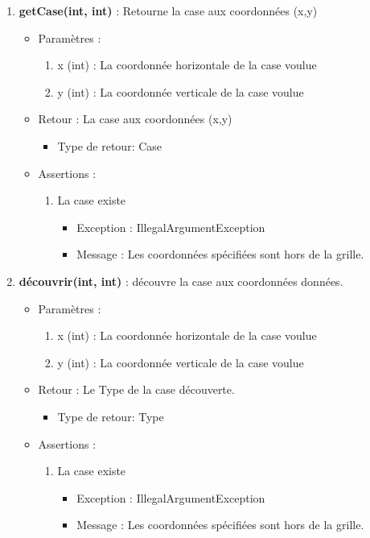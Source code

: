\begin{itemize}
\begin{enumerate}
    \item {\bf getCase(int, int) }: Retourne la case aux coordonnées (x,y)
      \begin{itemize}
      \item Paramètres : 
        \begin{enumerate}
        \item x (int) : La coordonnée horizontale de la case voulue
        \item y (int) : La coordonnée verticale de la case voulue          
        \end{enumerate}
      \item Retour : La case aux coordonnées (x,y)
          \begin{itemize}
          \item Type de retour: Case
          \end{itemize}
      \item Assertions : 
        \begin{enumerate}
        \item La case existe
          \begin{itemize}
            \item Exception : IllegalArgumentException
          \item Message : Les coordonnées spécifiées sont hors de la grille.
          \end{itemize}
        \end{enumerate}
      \end{itemize}
      
    \item {\bf découvrir(int, int) }: découvre la case aux coordonnées données.
      \begin{itemize}
      \item Paramètres : 
        \begin{enumerate}
        \item x (int) : La coordonnée horizontale de la case voulue
        \item y (int) : La coordonnée verticale de la case voulue          
        \end{enumerate}
      \item Retour : Le Type de la case découverte.
          \begin{itemize}
          \item Type de retour: Type
          \end{itemize}
      \item Assertions : 
        \begin{enumerate}
        \item La case existe
          \begin{itemize}
            \item Exception : IllegalArgumentException
          \item Message : Les coordonnées spécifiées sont hors de la grille.
          \end{itemize}
        \end{enumerate}
      \end{itemize}
      

\end{enumerate}
\end{itemize}

